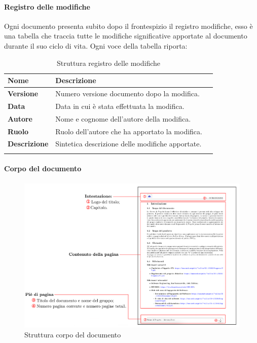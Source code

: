 {\paragraph*{Registro delle modifiche}      
Ogni documento presenta subito dopo il frontespizio il registro modifiche, esso è una tabella che traccia tutte le modifiche significative apportate al documento durante il suo ciclo di vita. Ogni voce della tabella riporta:

	\setlength{\freewidth}{\dimexpr\textwidth-1\tabcolsep}
	\renewcommand{\arraystretch}{1.5}
	\setlength{\aboverulesep}{0pt}
	\setlength{\belowrulesep}{0pt}
	\begin{longtable}{L{.210\freewidth} L{.6\freewidth} L{.080\freewidth}}
		\textbf{Nome} & \textbf{Descrizione} \\
		\toprule
		\endhead		
		
	\textbf{Versione} & Numero versione documento dopo la modifica. \\
	\textbf{Data} & Data in cui è stata effettuata la modifica. \\
	\textbf{Autore} & Nome e cognome dell'autore della modifica. \\
	\textbf{Ruolo} & Ruolo dell'autore che ha apportato la modifica.\\
	\textbf{Descrizione} & Sintetica descrizione delle modifiche apportate. \\	
		
		\bottomrule
		\hiderowcolors
		\caption{Struttura registro delle modifiche}
	\end{longtable}


\paragraph*{Corpo del documento}       

\begin{figure}[H]
    \centering
    \includegraphics[scale = 0.6]{components/immagini/corpodocumento.png}
    \caption{Struttura corpo del documento}
\end{figure}


}
